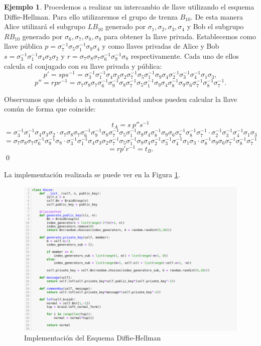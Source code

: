 \documentclass[12pt]{book}
\theoremstyle{definition}
\newtheorem{ejem}{Ejemplo}[section]
\begin{document}
\begin{ejem}
Procedemos a realizar un intercambio de llave utilizando el esquema Diffie-Hellman. Para ello utilizaremos el grupo de trenza $B_{10}$. De esta manera Alice utilizará el subgrupo $LB_{10}$ generado por $\sigma_1,\sigma_2,\sigma_3,\sigma_4$ y Bob el subgrupo $RB_{10}$ generado por $\sigma_6,\sigma_7,\sigma_8,\sigma_8$ para obtener la llave privada. Establecemos como llave pública $p=\sigma_7^{-1}\sigma_5\sigma_1^{-1}\sigma_9\sigma_4$ y como llaves privadas de Alice y Bob $s = \sigma_3^{-1}\sigma_1^{-1}\sigma_4\sigma_3\sigma_2$ y $r = \sigma_7\sigma_8\sigma_7\sigma_6^{-1}\sigma_9^{-1}\sigma_8$ respectivamente. Cada uno de ellos calcula el conjugado con su llave privada y pública:
$$p' = sps^{-1}=\sigma_3^{-1}\sigma_1^{-1}\sigma_4\sigma_3\sigma_2 \sigma_7^{-1}\sigma_5\sigma_1^{-1}\sigma_9\sigma_4 \sigma_2^{-1}\sigma_3^{-1}\sigma_4^{-1}\sigma_1\sigma_3,$$
$$p'' = rpr^{-1} = \sigma_7\sigma_8\sigma_7\sigma_6^{-1}\sigma_9^{-1}\sigma_8 \sigma_7^{-1}\sigma_5\sigma_1^{-1}\sigma_9\sigma_4 \sigma_8^{-1}\sigma_9\sigma_6\sigma_7^{-1}\sigma_8^{-1}\sigma_7^{-1}.$$


Observamos que debido a la conmutatividad ambos pueden calcular la llave común de forma que coincide:

$$t_A = s\ p''s^{-1} $$$$= \sigma_3^{-1}\sigma_1^{-1}\sigma_4\sigma_3\sigma_2\cdot \sigma_7\sigma_8\sigma_7\sigma_6^{-1}\sigma_9^{-1}\sigma_8 \sigma_7^{-1}\sigma_5\sigma_1^{-1}\sigma_9\sigma_4 \sigma_8^{-1}\sigma_9\sigma_6\sigma_7^{-1}\sigma_8^{-1}\sigma_7^{-1}\cdot\sigma_2^{-1}\sigma_3^{-1}\sigma_4^{-1}\sigma_1\sigma_3$$
$$=\sigma_7\sigma_8\sigma_7\sigma_6^{-1}\sigma_9^{-1}\sigma_8\cdot \sigma_3^{-1}\sigma_1^{-1}\sigma_4\sigma_3\sigma_2 \sigma_7^{-1}\sigma_5\sigma_1^{-1}\sigma_9\sigma_4 \sigma_2^{-1}\sigma_3^{-1}\sigma_4^{-1}\sigma_1\sigma_3\cdot
\sigma_8^{-1}\sigma_9\sigma_6\sigma_7^{-1}\sigma_8^{-1}\sigma_7^{-1} $$
$$= rp'r^{-1} = t_B.$$ \qed
\end{ejem}

La implementación realizada se puede ver en la Figura \ref{img:imp_ko}.

\begin{figure}
\includegraphics[scale=0.5]{imgs/KoLee.png}
\caption{Implementación del Esquema Diffie-Hellman}
\label{img:imp_ko}
\end{figure}
\end{document}
